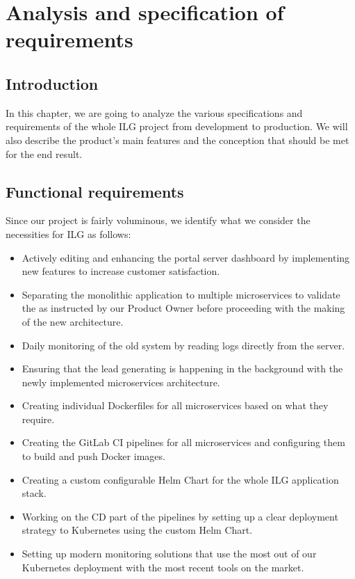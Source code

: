 \chapter{Analysis and specification of requirements}
\minitoc
\newpage

\setcounter{secnumdepth}{0} %
\section{Introduction}
In this chapter, we are going to analyze the various specifications and requirements of the whole ILG project from development to production.
We will also describe the product's main features and the conception that should be met for the end result.

\setcounter{secnumdepth}{2} %
\section{Functional requirements}
Since our project is fairly voluminous, we identify what we consider the necessities for ILG as follows:
\begin{itemize}
	\item Actively editing and enhancing the portal server dashboard by implementing new features to increase customer satisfaction.
	\item Separating the monolithic application to multiple microservices to validate the  as instructed by our Product Owner before proceeding with the making of the new architecture.
	\item Daily monitoring of the old system by reading logs directly from the server.
	\item Ensuring that the lead generating is happening in the background with the newly implemented microservices architecture.
	\item Creating individual Dockerfiles for all microservices based on what they require.
	\item Creating the GitLab CI pipelines for all microservices and configuring them to build and push Docker images.
	\item Creating a custom configurable Helm Chart for the whole ILG application stack.
	\item Working on the CD part of the pipelines by setting up a clear deployment strategy to Kubernetes using the custom Helm Chart.
	\item Setting up modern monitoring solutions that use the most out of our Kubernetes deployment with the most recent tools on the market.
\end{itemize}

